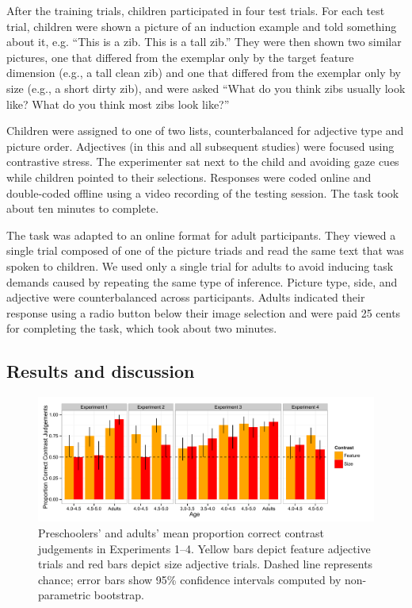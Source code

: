\documentclass[man]{apa2}
\begin{document}
After the training trials, children participated in four test trials.  For each test trial, children were shown a picture of an induction example and told something about it, e.g. ``This is a zib. This is a tall zib.''  They were then shown two similar pictures, one that differed from the exemplar only by the target feature dimension (e.g., a tall clean zib) and one that differed from the exemplar only by size (e.g., a short dirty zib), and were asked ``What do you think zibs usually look like?  What do you think most zibs look like?'' 

Children were assigned to one of two lists, counterbalanced for adjective type and picture order.  Adjectives (in this and all subsequent studies) were focused using contrastive stress. The experimenter sat next to the child and avoiding gaze cues while children pointed to their selections.  Responses were coded online and double-coded offline using a video recording of the testing session.  The task took about ten minutes to complete. 

The task was adapted to an online format for adult participants. They viewed a single trial composed of one of the picture triads and read the same text that was spoken to children. We used only a single trial for adults to avoid inducing task demands caused by repeating the same type of inference. Picture type, side, and adjective were counterbalanced across participants.  Adults indicated their response using a radio button below their image selection and were paid 25 cents for completing the task, which took about two minutes. 

\subsection{Results and discussion}

\begin{figure}[t] 
  \begin{center} 
    \includegraphics[width=6.5in]{figures/experimentsReorder.pdf} 
    \caption{\label{fig:experiments1thru4} Preschoolers' and adults' mean proportion correct contrast judgements in Experiments 1--4.     
  Yellow bars depict feature adjective trials and red bars depict size adjective trials. Dashed line represents chance; error bars show 95\% confidence intervals computed by non-parametric bootstrap.}
  \end{center} 
  \vspace{-10ex} 
\end{figure}
\end{document}
